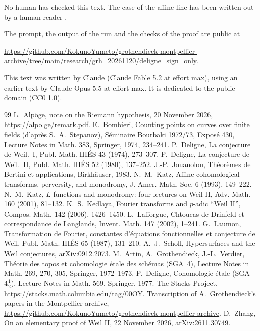 \documentclass[11pt,a4paper]{article}
\theoremstyle{plain}
\theoremstyle{remark}
\begin{document}
No human has checked this text. The case of the affine line has been written out by a human reader \cite{Zhang}.

The prompt, the output of the run and the checks of the proof are public at

{\raggedright\smallskip\noindent\url{https://github.com/KokunoYumeto/grothendieck-montpellier-archive/tree/main/research/grh_20261120/deligne_sign_only}.\par}

\smallskip
This text was written by Claude (Claude Fable 5.2 at effort max), using an earlier text by Claude Opus 5.5 at effort
max. It is dedicated to the public domain (CC0 1.0).

\begin{thebibliography}{99}
 L.~Alp\"oge, note on the Riemann hypothesis, 20 November 2026, \url{https://alpo.ge/remark.pdf}.
 E.~Bombieri, Counting points on curves over finite fields (d'apr\`es S.~A.~Stepanov), S\'eminaire
Bourbaki 1972/73, Expos\'e 430, Lecture Notes in Math. 383, Springer, 1974, 234--241.
 P.~Deligne, La conjecture de Weil.~I, Publ. Math. IH\'ES 43 (1974), 273--307.
 P.~Deligne, La conjecture de Weil.~II, Publ. Math. IH\'ES 52 (1980), 137--252.
 J.-P.~Jouanolou, Th\'eor\`emes de Bertini et applications, Birkh\"auser, 1983.
 N.~M.~Katz, Affine cohomological transforms, perversity, and monodromy, J. Amer. Math. Soc. 6
(1993), 149--222.
 N.~M.~Katz, $L$-functions and monodromy: four lectures on Weil II, Adv. Math. 160 (2001),
81--132.
 K.~S.~Kedlaya, Fourier transforms and $p$-adic ``Weil II'', Compos. Math. 142 (2006), 1426--1450.
 L.~Lafforgue, Chtoucas de Drinfeld et correspondance de Langlands, Invent. Math. 147 (2002),
1--241.
 G.~Laumon, Transformation de Fourier, constantes d'\'equations fonctionnelles et conjecture de
Weil, Publ. Math. IH\'ES 65 (1987), 131--210.
 A.~J.~Scholl, Hypersurfaces and the Weil conjectures,
\href{https://arxiv.org/abs/0912.2073}{arXiv:0912.2073}.
 M.~Artin, A.~Grothendieck, J.-L.~Verdier, Th\'eorie des topos et cohomologie \'etale des sch\'emas
(SGA~4), Lecture Notes in Math. 269, 270, 305, Springer, 1972--1973.
 P.~Deligne, Cohomologie \'etale (SGA~$4\frac12$), Lecture Notes in Math. 569, Springer, 1977.
 The Stacks Project, \url{https://stacks.math.columbia.edu/tag/00OY}.
 Transcription of A.~Grothendieck's papers in the Montpellier archive,
\url{https://github.com/KokunoYumeto/grothendieck-montpellier-archive}.
 D.~Zhang, On an elementary proof of Weil II, 22 November 2026,
\href{https://arxiv.org/abs/2611.30749}{arXiv:2611.30749}.
\end{thebibliography}
\end{document}
